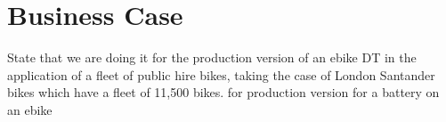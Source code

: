 \documentclass[a4paper, 10pt]{article}
\numberwithin{equation}{section}
\begin{document}

\newpage
\section{Business Case}
\label{sec:business_case}

State that we are doing it for the production version of an ebike DT in the application of a fleet of public hire bikes, taking the case of London Santander bikes which have a fleet of 11,500 bikes.
for production version for a battery on an ebike
\end{document}
